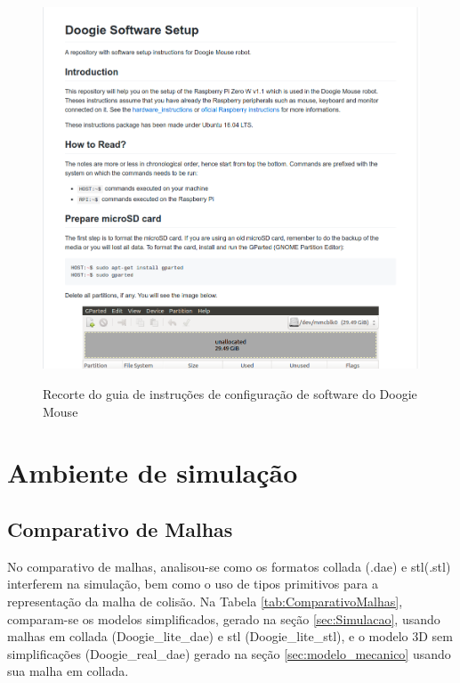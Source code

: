 \begin{figure}[H]
	\centering
	\caption{Recorte do guia de instruções de configuração de software do Doogie Mouse}
	\includegraphics[width=1\textwidth]
	{Figures/guia_software_setup}
	\label{fig:guia_software_setup}
\end{figure}

\section{Ambiente de simulação}
\label{sec:resultado_ambiente_de_simulacao}
\subsection{Comparativo de Malhas}
\label{ssec:comparativo_de_malhas}
No comparativo de malhas, analisou-se como os formatos \gls{collada} (.dae) e \gls{stl}(.stl) interferem na simulação, bem como o uso de tipos primitivos para a representação da malha de colisão. Na Tabela \ref{tab:ComparativoMalhas}, comparam-se os modelos simplificados, gerado na seção \ref{sec:Simulacao}, usando malhas em \gls*{collada} (Doogie\_lite\_dae) e \gls*{stl} (Doogie\_lite\_stl), e o modelo 3D sem simplificações (Doogie\_real\_dae) gerado na seção \ref{sec:modelo_mecanico} usando sua malha em \gls*{collada}.

